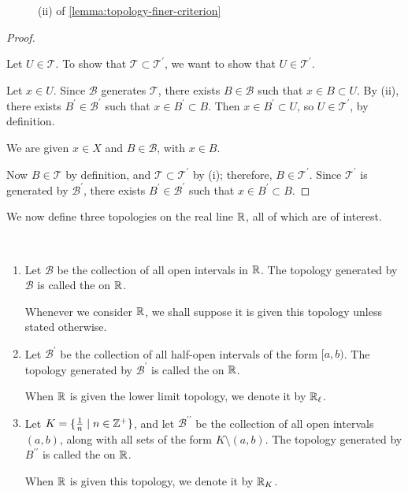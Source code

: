 \begin{figure}[H]
\centering
{}
\caption{(ii) of \ref{lemma:topology-finer-criterion}}
\end{figure}

\begin{proof} \

 Let $U\in\mathcal{T}$. To show that $\mathcal{T}\subset\mathcal{T}^\prime$, we want to show that $U\in\mathcal{T}^\prime$.

Let $x\in U$. Since $\mathcal{B}$ generates $\mathcal{T}$, there exists $B\in\mathcal{B}$ such that $x\in B\subset U$. By (ii), there exists $B^\prime\in\mathcal{B}^\prime$ such that $x\in B^\prime\subset B$. Then $x\in B^\prime\subset U$, so $U\in\mathcal{T}^\prime$, by definition.

 We are given $x\in X$ and $B\in\mathcal{B}$, with $x\in B$.

Now $B\in\mathcal{T}$ by definition, and $\mathcal{T}\subset\mathcal{T}^\prime$ by (i); therefore, $B\in\mathcal{T}^\prime$. Since $\mathcal{T}^\prime$ is generated by $\mathcal{B}^\prime$, there exists $B^\prime\in\mathcal{B}^\prime$ such that $x\in B^\prime\subset B$.
\end{proof}

We now define three topologies on the real line $\mathbb R$, all of which are of interest.

\begin{definition} \
\begin{enumerate}[label=(\roman*)]
\item Let $\mathcal{B}$ be the collection of all open intervals in $\mathbb R$. The topology generated by $\mathcal{B}$ is called the  on $\mathbb R$.

Whenever we consider $\mathbb R$, we shall suppose it is given this topology unless stated otherwise. 

\item Let $\mathcal{B}^\prime$ be the collection of all half-open intervals of the form $[a,b)$. The topology generated by $\mathcal{B}^\prime$ is called the  on $\mathbb R$. 

When $\mathbb R$ is given the lower limit topology, we denote it by $\mathbb R_\ell$.

\item Let $K=\{\frac{1}{n}\mid n\in\mathbb Z^+\}$, and let $\mathcal{B}^{\prime\prime}$ be the collection of all open intervals $(a,b)$, along with all sets of the form $K\setminus(a,b)$. The topology generated by $B^{\prime\prime}$ is called the  on $\mathbb R$.

When $\mathbb R$ is given this topology, we denote it by $\mathbb R_K$.
\end{enumerate}
\end{definition}

